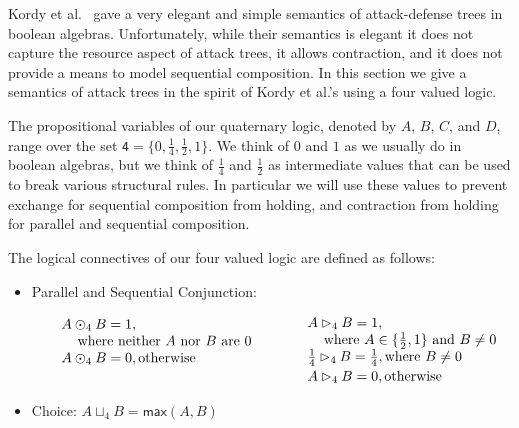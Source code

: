 \newcommand{\forth}{\frac{1}{4}}
\newcommand{\half}{\frac{1}{2}}

Kordy et al.~\cite{Kordy:2012} gave a very elegant and simple
semantics of attack-defense trees in boolean algebras.  Unfortunately,
while their semantics is elegant it does not capture the resource
aspect of attack trees, it allows contraction, and it does not provide
a means to model sequential composition.  In this section we give a
semantics of attack trees in the spirit of Kordy et al.'s using a four
valued logic.

The propositional variables of our quaternary logic, denoted by $A$, $B$,
$C$, and $D$, range over the set $\mathsf{4} = \{0, \forth, \half,
1\}$.  We think of $0$ and $1$ as we usually do in boolean algebras,
but we think of $\forth$ and $\half$ as intermediate values that can
be used to break various structural rules.  In particular we will use
these values to prevent exchange for sequential composition from
holding, and contraction from holding for parallel and sequential
composition.
\begin{definition}
  \label{def:logical-connectives}
  The logical connectives of our four valued logic are defined as
  follows:
  \begin{itemize}
  \item[] Parallel and Sequential Conjunction:
    \begin{center}
      \begin{math}
        \setlength{\arraycolsep}{10px}
        \begin{array}{lll}
          \begin{array}{lll}
            A \odot_4 B = 1,\\
            \,\,\,\,\,\,\,\text{where neither $A$ nor $B$ are $0$}\\
          A \odot_4 B = 0, \text{otherwise}\\
          \\
        \end{array}
        &
        \begin{array}{lll}          
          A \rhd_4 B = 1,\\
          \,\,\,\,\,\,\,\text{where } A \in \{\half, 1\} \text{ and } B \neq 0\\
          \forth \rhd_4 B = \forth, \text{where $B \neq 0$}\\[2px]         
          A \rhd_4 B = 0, \text{otherwise}
        \end{array}
        \end{array}
      \end{math}
    \end{center}
  \item[] Choice: $A \sqcup_4 B = \mathsf{max}(A,B)$    
  \end{itemize}
\end{definition}
